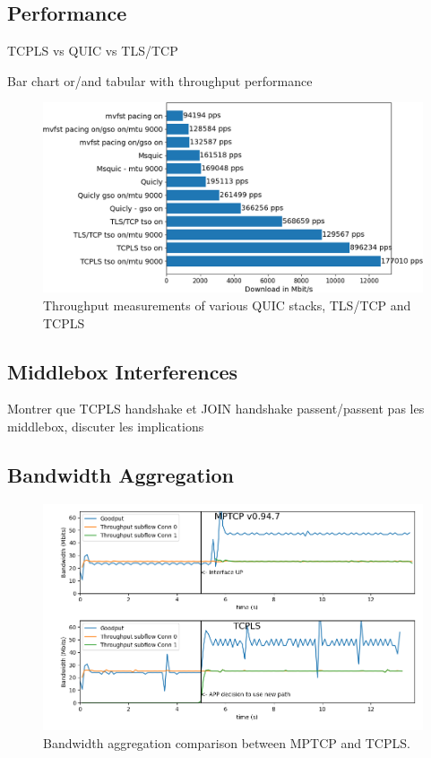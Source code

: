 \subsection{Performance}
\label{sec:perf}

TCPLS vs QUIC vs TLS/TCP

Bar chart or/and tabular with throughput performance

\begin{figure}[!t]
   \begin{center}
     \includegraphics[width=\columnwidth]{figures/perf.png}
   \end{center}
   \caption{Throughput measurements of various QUIC stacks, TLS/TCP and TCPLS}
   \label{fig:perf}
\end{figure}

\subsection{Middlebox Interferences}

Montrer que TCPLS handshake et JOIN handshake passent/passent pas les middlebox,
discuter les implications

\subsection{Bandwidth Aggregation}

\begin{figure}[!t]
  \begin{center}
    \includegraphics[width=\columnwidth]{figures/multipath_aggregation_comparison.png}
  \end{center}
  \caption{Bandwidth aggregation comparison between MPTCP and TCPLS.}
\end{figure}

